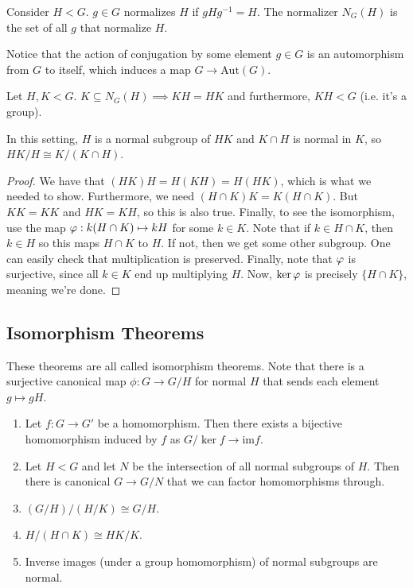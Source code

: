 \begin{theorem}
    Consider $H < G$. $g \in G$ normalizes $H$ if $gHg^{-1} = H$. The normalizer $N_G(H)$ is the set of all $g$ that normalize $H$.
\end{theorem}
Notice that the action of conjugation by some element $g \in G$ is an automorphism from $G$ to itself,
which induces a map $G \to \text{Aut}(G)$.
\begin{theorem}
    Let $H, K < G$.
    $K \subseteq N_G(H) \implies KH = HK$
    and furthermore, $KH < G$ (i.e. it's a group).
\end{theorem}
\begin{theorem}
In this setting, $H$ is a normal subgroup of $HK$ and $K \cap H$ is normal in $K$, so $HK/H \cong K/(K\cap H)$.
\begin{proof}
    We have that $(HK)H = H(KH) = H(HK)$, which is what we needed to show.
    Furthermore, we need $(H\cap K)K = K(H \cap K)$. But $KK = KK$ and $HK = KH$, so this is also true.
    Finally, to see the isomorphism, use the map $\varphi: k(H \cap K) \mapsto k H$ for some $k \in K$.
    Note that if $k \in H \cap K$, then $k \in H$ so this maps $H \cap K$ to $H$. If not, then we get some other subgroup.
    One can easily check that multiplication is preserved. Finally, note that $\varphi$ is surjective, since all $k \in K$
    end up multiplying $H$.
    Now, $\ker \varphi$ is precisely $\{H \cap K\}$, meaning we're done.
\end{proof}
\end{theorem}

\subsection{Isomorphism Theorems}
These theorems are all called isomorphism theorems.
Note that there is a surjective canonical map $\phi: G \to G/H$ for normal $H$
that sends each element $g \mapsto gH$.
\begin{enumerate}
    \item Let $f: G \to G'$ be a homomorphism. Then there exists a bijective homomorphism induced by $f$ as $G/\ker f \to \textrm{im} f$.
    \item Let $H < G$ and let $N$ be the intersection of all normal subgroups of $H$. Then there is canonical $G \to G/N$
    that we can factor homomorphisms through.
    \item $(G/H)/(H/K) \cong G/H$.
    \item $H/(H \cap K) \cong HK/K$.
    \item Inverse images (under a group homomorphism) of normal subgroups are normal.
\end{enumerate}

